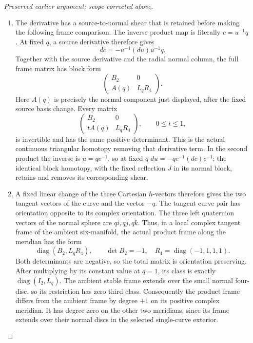 \begin{proof}[Preserved earlier argument; scope corrected above]
\begin{enumerate}[label=\arabic*.]
\item The derivative has a source-to-normal shear that is
retained before making the following frame comparison.
The inverse product map is literally \(c=u^{-1}q\).
At fixed \(q\), a source derivative therefore gives
\[
                   dc=-u^{-1}(du)u^{-1}q.
\]
Together with the source derivative and the radial
normal column, the full frame matrix has block form
\[
       \begin{pmatrix}
         B_2&0\\ A(q)&L_qR_4
       \end{pmatrix}.
\]
Here \(A(q)\) is precisely the normal component just
displayed, after the fixed source basis change.
Every matrix
\[
       \begin{pmatrix}
         B_2&0\\ tA(q)&L_qR_4
       \end{pmatrix},\qquad 0\le t\le1,
\]
is invertible and has the same positive determinant.
This is the actual continuous triangular homotopy
removing that derivative term. In the second product
the inverse is \(u=qc^{-1}\), so at fixed \(q\)
\(du=-qc^{-1}(dc)c^{-1}\); the identical block homotopy,
with the fixed reflection \(J\) in its normal block,
retains and removes its corresponding shear.

\item A fixed linear change of the three Cartesian \(h\)-vectors
therefore gives the two tangent vectors of the curve and
the vector \(-q\). The tangent curve pair has orientation
opposite to its complex orientation. The three left
quaternion vectors of the normal sphere are \(qi,qj,qk\).
Thus, in a local complex tangent frame of the ambient
six-manifold, the actual product frame along the meridian
has the form
\[
       \operatorname{diag}(B_2,L_q R_4),\qquad
       \det B_2=-1,\quad
       R_4=\operatorname{diag}(-1,1,1,1).
                                                        \tag{P3K.31.4}
\]
Both determinants are negative, so the total matrix is
orientation preserving. After multiplying by its constant
value at \(q=1\), its class is exactly
\(\operatorname{diag}(I_2,L_q)\).
The ambient stable frame extends over the small normal
four-disc, so its restriction has zero third class.
Consequently the product frame differs from the ambient
frame by degree \(+1\) on its positive complex meridian.
It has degree zero on the other two meridians, since its
frame extends over their normal discs in the selected
single-curve exterior.


\end{enumerate}
\end{proof}
